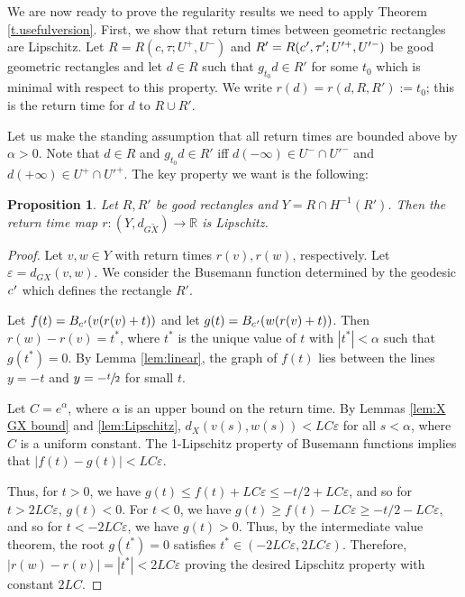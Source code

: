 \documentclass[JEP,XML,SOM,Unicode,NoFloatCountersInSection]{cedram}
\let\epsilon\varepsilon
\newcommand{\cpr}{c\mkern1mu'}
\newtheorem{prop}[thm]{Proposition}
\theoremstyle{definition}
\numberwithin{equation}{section}
\begin{document}
We are now ready to prove the regularity results we need to apply Theorem \ref{t.usefulversion}. First, we show that return times between geometric rectangles are Lipschitz. Let $R=R(c, \tau; U^+, U^-)$ and $R'=R(\cpr, \tau'; U'^+, U'^-)$ be good geometric rectangles and let $d\in R$ such that $g_{t_0}d \in R'$ for some $t_0$ which is minimal with respect to this property. We write $r(d)=r(d, R, R') :=t_0$; this is the return time for $d$ to $R \cup R'$.

Let us make the standing assumption that all return times are bounded above by $\alpha>0$. Note that $d\in R$ and $g_{t_0}d \in R'$ iff $d(-\infty)\in U^-\cap U'^-$ and $d(+\infty)\in U^+\cap U'^+$. The key property we want is the following:

\begin{prop}\label{prop:Lipschitz}
Let $R, R'$ be good rectangles and $Y= R \cap H^{-1}(R')$. Then the return time map $r:(Y, d_{G\tilde X}) \to \mathbb{R}$ is Lipschitz.
\end{prop}

\begin{proof}

Let $v,w \in Y$ with return times $r(v), r(w)$, respectively. Let $\epsilon = d_{GX}(v,w)$. We consider the Busemann function determined by the geodesic $\cpr$ which defines the rectangle $R'$.

Let $f(t) = B_{\cpr}(v(r(v)+t))$ and let $g(t) = B_{\cpr}(w(r(v)+t))$. Then $r(w)-r(v) = t^*$, where $t^*$ is the unique value of $t$ with $|t^\ast|< \alpha$ such that $g(t^\ast) = 0$. By Lemma \ref{lem:linear}, the graph of $f(t)$ lies between the lines $y=-t$ and $y=-\sfrac{t}{2}$ for small $t$.

Let $C = e^\alpha$, where $\alpha$ is an upper bound on the return time. By Lemmas \ref{lem:X GX bound} and \ref{lem:Lipschitz}, $d_X(v(s), w(s))<LC\epsilon$ for all $s<\alpha$, where $C$ is a uniform constant. The 1-Lipschitz property of Busemann functions implies that $|f(t)-g(t)| < LC\epsilon$.

Thus, for $t>0$, we have $g(t)\leq f(t)+LC \epsilon \leq -t/2 +LC\epsilon$, and so for $t>2LC \epsilon$, $g(t)<0$. For $t<0$, we have $g(t) \geq f(t)-LC \epsilon \geq -t/2-LC \epsilon$, and so for $t<-2LC \epsilon$, we have $g(t)>0$. Thus, by the intermediate value theorem, the root $g(t^\ast)=0$ satisfies $t^\ast \in (-2LC\epsilon, 2LC \epsilon)$. Therefore, $|r(w)-r(v)| = |t^\ast| < 2LC\epsilon$ proving the desired Lipschitz property with constant $2LC$.
\end{proof}
\end{document}
